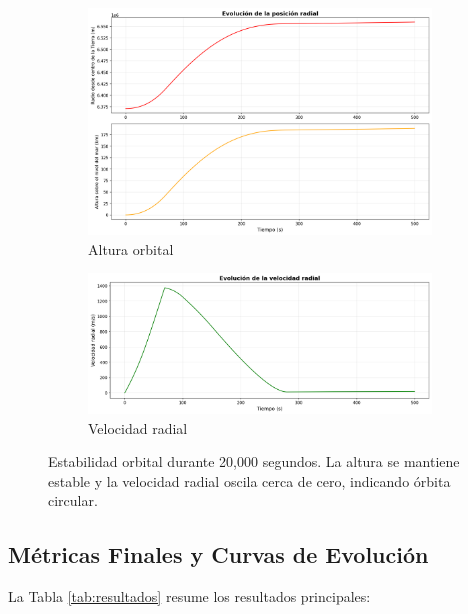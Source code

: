 \documentclass[10pt,a4paper]{article}
\begin{document}
\begin{figure}[H]
\centering
\begin{subfigure}{0.48\textwidth}
    \includegraphics[width=\textwidth]{../graficos/03_posicion_radial.png}
    \caption{Altura orbital}
\end{subfigure}
\hfill
\begin{subfigure}{0.48\textwidth}
    \includegraphics[width=\textwidth]{../graficos/02_velocidad_radial.png}
    \caption{Velocidad radial}
\end{subfigure}
\caption{Estabilidad orbital durante 20,000 segundos. La altura se mantiene estable y la velocidad radial oscila cerca de cero, indicando órbita circular.}
\label{fig:estabilidad}
\end{figure}

\subsection{Métricas Finales y Curvas de Evolución}
La Tabla \ref{tab:resultados} resume los resultados principales:
\end{document}
